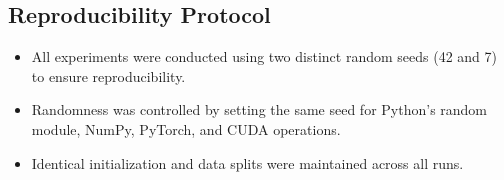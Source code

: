 \subsection*{Reproducibility Protocol}
\begin{itemize}
    \item All experiments were conducted using two distinct random seeds (42 and 7) to ensure reproducibility.
    \item Randomness was controlled by setting the same seed for Python's random module, NumPy, PyTorch, and CUDA operations.
    \item Identical initialization and data splits were maintained across all runs.
\end{itemize}





